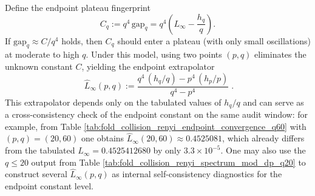\begin{remark}\label{rem:pom-endpoint-extrapolator}
Define the endpoint plateau fingerprint
\[
C_q:=q^4\,\mathrm{gap}_q
=q^4\left(L_\infty-\frac{h_q}{q}\right).
\]
If \(\mathrm{gap}_q\approx C/q^4\) holds, then \(C_q\) should enter a plateau (with only small oscillations) at moderate to high \(q\).
Under this model, using two points \((p,q)\) eliminates the unknown constant \(C\), yielding the endpoint extrapolator
\[
\boxed{\;
\widehat L_\infty(p,q)
:=\frac{q^4\,(h_q/q)-p^4\,(h_p/p)}{q^4-p^4}\; }.
\]
This extrapolator depends only on the tabulated values of \(h_q/q\) and can serve as a cross-consistency check of the endpoint constant on the same audit window:
for example, from Table \ref{tab:fold_collision_renyi_endpoint_convergence_q60} with \((p,q)=(20,60)\) one obtains
\(
\widehat L_\infty(20,60)\approx 0.4525081
\),
which already differs from the tabulated \(L_\infty=0.4525412680\) by only \(3.3\times 10^{-5}\).
One may also use the \(q\le 20\) output from Table \ref{tab:fold_collision_renyi_spectrum_mod_dp_q20} to construct several \(\widehat L_\infty(p,q)\) as internal self-consistency diagnostics for the endpoint constant level.
\end{remark}

